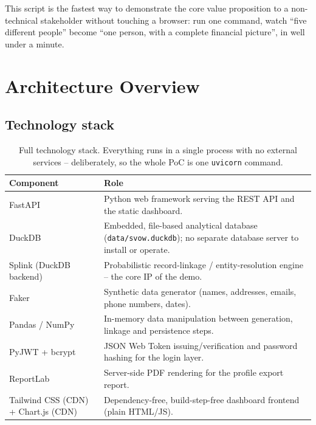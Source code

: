 \documentclass[11pt]{report}
\begin{document}
\begin{bizbox}
This script is the fastest way to demonstrate the core value proposition to a non-technical stakeholder without touching a browser: run one command, watch ``five different people'' become ``one person, with a complete financial picture'', in well under a minute.
\end{bizbox}

\chapter{Architecture Overview}
\label{ch:architecture}

\section{Technology stack}

\begin{table}[h]
\centering
\small
\begin{tabular}{@{}p{3.6cm}p{9.5cm}@{}}
\toprule
\textbf{Component} & \textbf{Role} \\
\midrule
FastAPI & Python web framework serving the REST API and the static dashboard. \\
DuckDB & Embedded, file-based analytical database (\texttt{data/svow.duckdb}); no separate database server to install or operate. \\
Splink (DuckDB backend) & Probabilistic record-linkage / entity-resolution engine -- the core IP of the demo. \\
Faker & Synthetic data generator (names, addresses, emails, phone numbers, dates). \\
Pandas / NumPy & In-memory data manipulation between generation, linkage and persistence steps. \\
PyJWT + bcrypt & JSON Web Token issuing/verification and password hashing for the login layer. \\
ReportLab & Server-side PDF rendering for the profile export report. \\
Tailwind CSS (CDN) + Chart.js (CDN) & Dependency-free, build-step-free dashboard frontend (plain HTML/JS). \\
\bottomrule
\end{tabular}
\caption{Full technology stack. Everything runs in a single process with no external services -- deliberately, so the whole PoC is one \texttt{uvicorn} command.}
\end{table}
\end{document}
